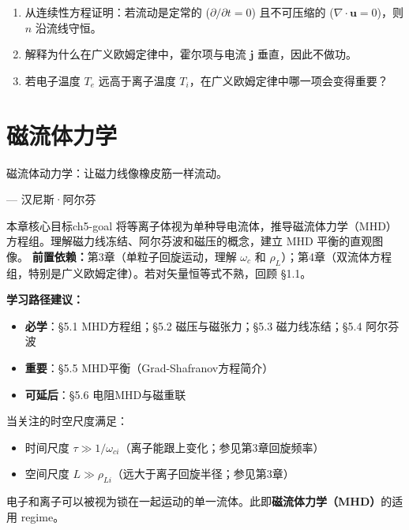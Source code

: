 \documentclass[12pt,a4paper,openany,oneside]{book}
\newcommand{\vect}[1]{\bm{#1}}
\newcommand{\divg}{\nabla\cdot}
\begin{document}
\begin{miniquiz}
\begin{enumerate}
\item 从连续性方程证明：若流动是定常的 ($\partial/\partial t = 0$) 且不可压缩的 ($\divg\vect{u}=0$)，则 $n$ 沿流线守恒。
\item 解释为什么在广义欧姆定律中，霍尔项与电流 $\vect{j}$ 垂直，因此不做功。
\item 若电子温度 $T_e$ 远高于离子温度 $T_i$，在广义欧姆定律中哪一项会变得重要？
\end{enumerate}
\end{miniquiz}




\chapter{磁流体力学}\label{ch:5}
\epigraph{磁流体动力学：让磁力线像橡皮筋一样流动。}{--- 汉尼斯·阿尔芬}

\begin{insight}{本章核心目标}{ch5-goal}
将等离子体视为单种导电流体，推导磁流体力学（MHD）方程组。理解磁力线冻结、阿尔芬波和磁压的概念，建立 MHD 平衡的直观图像。
\tcblower
\textbf{前置依赖：}第3章（单粒子回旋运动，理解 $\omega_c$ 和 $\rho_L$）；第4章（双流体方程组，特别是广义欧姆定律）。若对矢量恒等式不熟，回顾 \S1.1。

\textbf{学习路径建议：}

\begin{itemize}[leftmargin=*]
\item[\textcolor{red}{$\blacksquare$}] \textbf{必学}：\S5.1 MHD方程组；\S5.2 磁压与磁张力；\S5.3 磁力线冻结；\S5.4 阿尔芬波
\item[\textcolor{orange}{$\blacksquare$}] \textbf{重要}：\S5.5 MHD平衡（Grad-Shafranov方程简介）
\item[\textcolor{green}{$\blacksquare$}] \textbf{可延后}：\S5.6 电阻MHD与磁重联
\end{itemize}
\end{insight}

当关注的时空尺度满足：
\begin{itemize}
\item 时间尺度 $\tau \gg 1/\omega_{ci}$（离子能跟上变化；参见第3章回旋频率）
\item 空间尺度 $L \gg \rho_{Li}$（远大于离子回旋半径；参见第3章）
\end{itemize}
电子和离子可以被视为锁在一起运动的单一流体。此即\textbf{磁流体力学（MHD）}的适用 regime。
\end{document}
